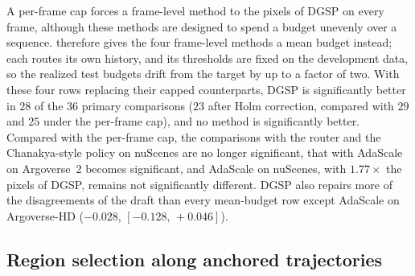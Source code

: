 \documentclass[10pt,letterpaper]{article}
\newcommand{\method}{DGSP\xspace}
\newcommand{\ci}[2]{[#1,\allowbreak\,#2]}
\theoremstyle{remark}
\theoremstyle{plain}
\theoremstyle{definition}
\begin{document}
A per-frame cap forces a frame-level method to the pixels of \method on every frame, although these methods are designed to spend a budget unevenly over a sequence.
 therefore gives the four frame-level methods a mean budget instead; each routes its own history, and its thresholds are fixed on the development data, so the realized test budgets drift from the target by up to a factor of two.
With these four rows replacing their capped counterparts, \method is significantly better in $28$ of the $36$ primary comparisons ($23$ after Holm correction, compared with $29$ and $25$ under the per-frame cap), and no method is significantly better.
Compared with the per-frame cap, the comparisons with the router and the Chanakya-style policy on nuScenes are no longer significant, that with AdaScale on Argoverse~2 becomes significant, and AdaScale on nuScenes, with $1.77\times$ the pixels of \method, remains not significantly different.
\method also repairs more of the disagreements of the draft than every mean-budget row except AdaScale on Argoverse-HD ($-0.028$, $\ci{-0.128}{+0.046}$).

\subsection{Region selection along anchored trajectories}
\label{sec:supp_anchored}
\end{document}

